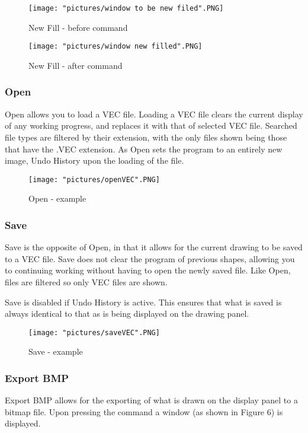 \documentclass[12pt]{article} %
\begin{document}
\begin{figure}[hbtp]
\caption{New Fill - before command}
\centering
\texttt{[image: "pictures/window to be new filed".PNG]}
\end{figure}

\begin{figure}[hbtp]
\caption{New Fill - after command}
\centering
\texttt{[image: "pictures/window new filled".PNG]}
\end{figure}

\subsubsection{Open}
Open allows you to load a VEC file. Loading a VEC file clears the current display of any working progress, and replaces it with that of selected VEC file. Searched file types are filtered by their extension, with the only files shown being those that have the .VEC extension. As Open sets the program to an entirely new image, Undo History upon the loading of the file.

\begin{figure}[hbtp]
\caption{Open - example}
\centering
\texttt{[image: "pictures/openVEC".PNG]}
\end{figure}

\subsubsection{Save}
Save is the opposite of Open, in that it allows for the current drawing to be saved to a VEC file. Save does not clear the program of previous shapes, allowing you to continuing working without having to open the newly saved file. Like Open, files are filtered so only VEC files are shown. 

Save is disabled if Undo History is active. This ensures that what is saved is always identical to that as is being displayed on the drawing panel.

\begin{figure}[hbtp]
\caption{Save - example}
\centering
\texttt{[image: "pictures/saveVEC".PNG]}
\end{figure}

\subsubsection{Export BMP}
Export BMP allows for the exporting of what is drawn on the display panel to a bitmap file. Upon pressing the command a window (as shown in Figure 6) is displayed.
\end{document}
